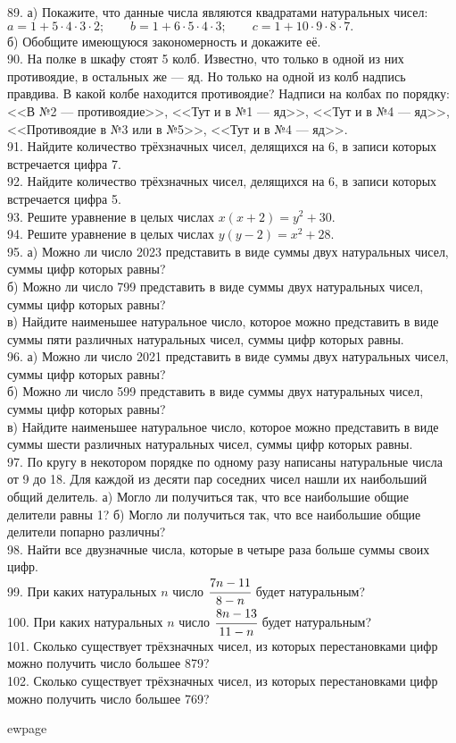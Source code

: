 89. а) Покажите, что данные числа являются квадратами натуральных чисел:\\
$a=1+5\cdot4\cdot3\cdot2;\qquad b=1+6\cdot5\cdot4\cdot3;\qquad c=1+10\cdot9\cdot8\cdot7.$\\
б) Обобщите имеющуюся закономерность и докажите её.\\
90. На полке в шкафу стоят 5 колб. Известно, что только в одной из них противоядие, в остальных же --- яд. Но только на одной из колб надпись правдива. В какой колбе находится противоядие? Надписи на колбах по порядку: <<В №2 --- противоядие>>, <<Тут и в №1 --- яд>>, <<Тут и в №4 --- яд>>, <<Противоядие в №3 или в №5>>,
<<Тут и в №4 --- яд>>.\\
91. Найдите количество трёхзначных чисел, делящихся на 6, в записи которых встречается цифра 7.\\
92. Найдите количество трёхзначных чисел, делящихся на 6, в записи которых встречается цифра 5.\\
93. Решите уравнение в целых числах $x(x+2)=y^2+30.$\\
94. Решите уравнение в целых числах $y(y-2)=x^2+28.$\\
95. а) Можно ли число 2023 представить в виде суммы двух натуральных чисел, суммы цифр которых равны?\\
б) Можно ли число 799 представить в виде суммы двух натуральных чисел, суммы цифр которых равны?\\
в) Найдите наименьшее натуральное число, которое можно представить в виде суммы пяти различных натуральных чисел, суммы цифр которых равны.\\
96. а) Можно ли число 2021 представить в виде суммы двух натуральных чисел, суммы цифр которых равны?\\
б) Можно ли число 599 представить в виде суммы двух натуральных чисел, суммы цифр которых равны?\\
в) Найдите наименьшее натуральное число, которое можно представить в виде суммы шести различных натуральных чисел, суммы цифр которых равны.\\
97. По кругу в некотором порядке по одному разу написаны натуральные числа от 9 до 18. Для каждой из десяти пар соседних чисел нашли их наибольший общий делитель. а) Могло ли получиться так, что все наибольшие общие делители равны 1? б) Могло ли получиться так, что все наибольшие общие делители попарно различны?\\
98. Найти все двузначные числа, которые в четыре раза больше суммы своих цифр.\\
99. При каких натуральных $n$ число $\cfrac{7n-11}{8-n}$ будет натуральным?\\
100. При каких натуральных $n$ число $\cfrac{8n-13}{11-n}$ будет натуральным?\\
101. Сколько существует трёхзначных чисел, из которых перестановками цифр можно получить число большее 879?\\
102. Сколько существует трёхзначных чисел, из которых перестановками цифр можно получить число большее 769?

ewpage

